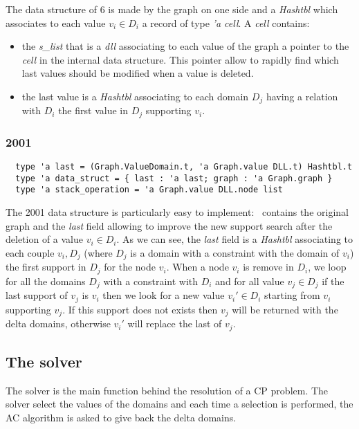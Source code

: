 \documentclass{rapport}
\begin{document}
The data structure of \ac{6} is made by the graph on one side and a \textit{Hashtbl} which associates to each value $v_i \in D_i$ a record of type \textit{'a cell}. A \textit{cell} contains:
\begin{itemize}
  \item the \textit{s\_list} that is a \textit{dll} associating to each value of the graph a pointer to the \textit{cell} in the internal data structure. This pointer allow to rapidly find which last values should be modified when a value is deleted.
  \item the last value is a \textit{Hashtbl} associating to each domain $D_j$ having a relation with $D_i$ the first value in $D_j$ supporting $v_i$.
\end{itemize}

\subsubsection{\ac{2001}}

\begin{verbatim}
  type 'a last = (Graph.ValueDomain.t, 'a Graph.value DLL.t) Hashtbl.t
  type 'a data_struct = { last : 'a last; graph : 'a Graph.graph }
  type 'a stack_operation = 'a Graph.value DLL.node list
\end{verbatim}

The \ac{2001} data structure is particularly easy to implement: \ds\ contains the original graph and the \textit{last} field allowing to improve the new support search after the deletion of a value $v_i \in D_i$. As we can see, the \textit{last} field is a \textit{Hashtbl} associating to each couple $v_i, D_j$ (where $D_j$ is a domain with a constraint with the domain of $v_i$) the first support in $D_j$ for the node $v_i$. When a node $v_i$ is remove in $D_i$, we loop for all the domains $D_j$ with a constraint with $D_i$ and for all value $v_j \in D_j$ if the last support of $v_j$ is $v_i$ then we look for a new value $v_i' \in D_i$ starting from $v_i$ supporting $v_j$. If this support does not exists then $v_j$ will be returned with the delta domains, otherwise $v_i'$ will replace the last of $v_j$.

\subsection{The solver}

The solver is the main function behind the resolution of a CP problem. The solver select the values of the domains and each time a selection is performed, the AC algorithm is asked to give back the delta domains.
\end{document}
